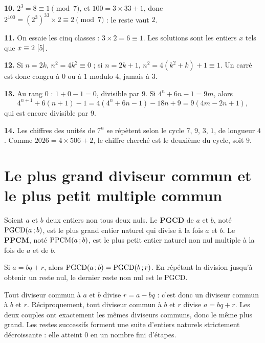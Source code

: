 \begin{corrige}
\textbf{10.} $2^{3} = 8 \equiv 1 \pmod 7$, et $100 = 3\times33+1$, donc
$2^{100} = \left(2^{3}\right)^{33}\times2 \equiv 2 \pmod 7$ : le reste vaut
$2$.

\textbf{11.} On essaie les cinq classes : $3\times2 = 6 \equiv 1$. Les
solutions sont les entiers $x$ tels que $x \equiv 2 \ [5]$.

\textbf{12.} Si $n = 2k$, $n^{2} = 4k^{2} \equiv 0$ ; si $n = 2k+1$,
$n^{2} = 4\left(k^{2}+k\right)+1 \equiv 1$. Un carré est donc congru à $0$ ou
à $1$ modulo $4$, jamais à $3$.

\textbf{13.} Au rang $0$ : $1+0-1 = 0$, divisible par $9$. Si
$4^{n}+6n-1 = 9m$, alors
\[
  4^{n+1}+6(n+1)-1 = 4\left(4^{n}+6n-1\right)-18n+9 = 9(4m-2n+1),
\]
qui est encore divisible par $9$.

\textbf{14.} Les chiffres des unités de $7^{n}$ se répètent selon le cycle
$7$, $9$, $3$, $1$, de longueur $4$. Comme $2026 = 4\times506+2$, le chiffre
cherché est le deuxième du cycle, soit $9$.
\end{corrige}

\section{Le plus grand diviseur commun et le plus petit multiple commun}

\begin{definition}
Soient $a$ et $b$ deux entiers non tous deux nuls. Le \textbf{PGCD} de $a$ et
$b$, noté $\operatorname{PGCD}(a\,;b)$, est le plus grand entier naturel qui divise à la
fois $a$ et $b$. Le \textbf{PPCM}, noté $\operatorname{PPCM}(a\,;b)$, est le plus petit
entier naturel non nul multiple à la fois de $a$ et de $b$.
\end{definition}

\begin{theoreme}
Si $a = bq+r$, alors $\operatorname{PGCD}(a\,;b) = \operatorname{PGCD}(b\,;r)$. En répétant la division
jusqu'à obtenir un reste nul, le dernier reste non nul est le PGCD.
\end{theoreme}

\begin{demonstration}
Tout diviseur commun à $a$ et $b$ divise $r = a-bq$ : c'est donc un diviseur
commun à $b$ et $r$. Réciproquement, tout diviseur commun à $b$ et $r$ divise
$a = bq+r$. Les deux couples ont exactement les mêmes diviseurs communs, donc
le même plus grand. Les restes successifs forment une suite d'entiers naturels
strictement décroissante : elle atteint $0$ en un nombre fini d'étapes.
\end{demonstration}

